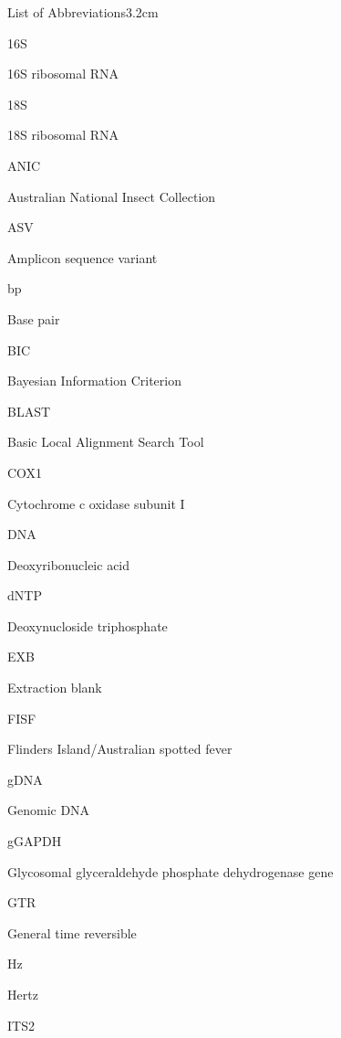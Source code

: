 \documentclass[a4paper, nobind]{templates/ociamthesis}
\begin{document}
\begin{romanpages}
\begin{mclistof}{List of Abbreviations}{3.2cm}
\item[16S]

16S ribosomal RNA

\item[18S]

18S ribosomal RNA

\item[ANIC]

Australian National Insect Collection

\item[ASV]

Amplicon sequence variant

\item[bp]

Base pair

\item[BIC]

Bayesian Information Criterion

\item[BLAST]

Basic Local Alignment Search Tool

\item[COX1]

Cytochrome c oxidase subunit I

\item[DNA]

Deoxyribonucleic acid

\item[dNTP]

Deoxynucloside triphosphate

\item[EXB]

Extraction blank

\item[FISF]

Flinders Island/Australian spotted fever

\item[gDNA]

Genomic DNA

\item[gGAPDH]

Glycosomal glyceraldehyde phosphate dehydrogenase gene

\item[GTR]

General time reversible

\item[Hz]

Hertz

\item[ITS2]


\end{mclistof}
\end{romanpages}
\end{document}
